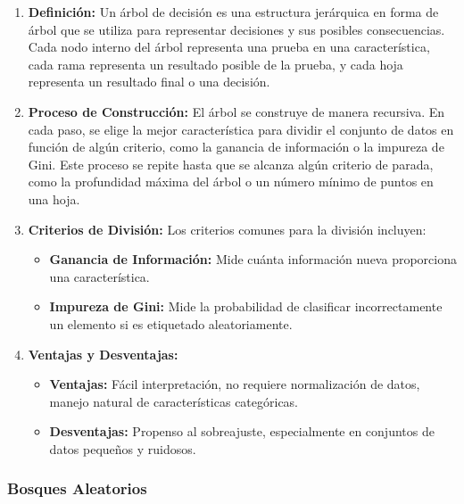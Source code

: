 \documentclass[12pt]{article}
\begin{document}
\begin{enumerate}
    \item \textbf{Definición:}
        Un árbol de decisión es una estructura jerárquica en forma de árbol que se utiliza para representar decisiones y sus posibles consecuencias. Cada nodo interno del árbol representa una prueba en una característica, cada rama representa un resultado posible de la prueba, y cada hoja representa un resultado final o una decisión.

    \item \textbf{Proceso de Construcción:}
        El árbol se construye de manera recursiva. En cada paso, se elige la mejor característica para dividir el conjunto de datos en función de algún criterio, como la ganancia de información o la impureza de Gini. Este proceso se repite hasta que se alcanza algún criterio de parada, como la profundidad máxima del árbol o un número mínimo de puntos en una hoja.

    \item \textbf{Criterios de División:}
        Los criterios comunes para la división incluyen:
        \begin{itemize}
            \item \textbf{Ganancia de Información:} Mide cuánta información nueva proporciona una característica.
            \item \textbf{Impureza de Gini:} Mide la probabilidad de clasificar incorrectamente un elemento si es etiquetado aleatoriamente.
        \end{itemize}

    \item \textbf{Ventajas y Desventajas:}
        \begin{itemize}
            \item \textbf{Ventajas:} Fácil interpretación, no requiere normalización de datos, manejo natural de características categóricas.
            \item \textbf{Desventajas:} Propenso al sobreajuste, especialmente en conjuntos de datos pequeños y ruidosos.
        \end{itemize}
\end{enumerate}

\subsubsection{Bosques Aleatorios}
\end{document}
